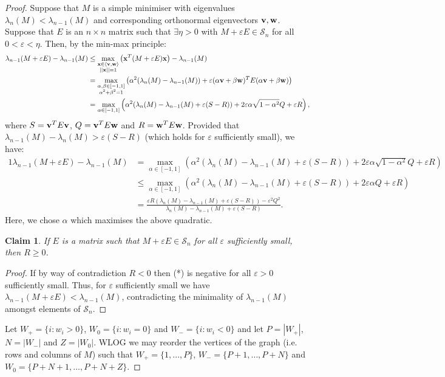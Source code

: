\documentclass[10pt,a4paper]{amsart}
\newtheorem{claim}{Claim}
\begin{document}
\begin{proof}
    Suppose that $M$ is a simple minimiser with eigenvalues $\lambda_n(M)<\lambda_{n-1}(M)$ and corresponding orthonormal eigenvectors $\bold{v,w}$. Suppose that $E$ is an $n\times n$ matrix such that $\exists \eta>0$ with $M+\varepsilon E \in \mathcal{S}_n$ for all $0<\varepsilon<\eta$. Then, by the min-max principle:
    \begin{alignat*}{1}
        \lambda_{n-1}(M+\varepsilon E) - \lambda_{n-1}(M) & \le \max_{\substack{\bold{x} \in \braket{\bold{v,w}} \\ ||\bold{x}|| = 1}} \left(\bold{x}^{T}(M+\varepsilon E)\bold{x} \right) - \lambda_{n-1}(M) \\
        & = \max_{\substack{\alpha, \beta \in [-1,1]\\ \alpha^2 + \beta^2 = 1}} \left(\alpha^2 (\lambda_{n}(M)-\lambda_{n-1}(M)) + \varepsilon(\alpha\bold{v} + \beta \bold{w})^{T}  E (\alpha\bold{v} + \beta \bold{w})\right)\\ & = \max_{\alpha\in [-1,1]} \left(\alpha^2 (\lambda_n(M)-\lambda_{n-1}(M) + \varepsilon(S-R)) + 2\varepsilon \alpha\sqrt{1-\alpha^2} Q + \varepsilon R\right),
    \end{alignat*}
    where $S = \bold{v}^{T}E\bold{v}$, $Q = \bold{v}^{T}E\bold{w}$ and $R = \bold{w}^{T}E\bold{w}$. Provided that $\lambda_{n-1}(M)-\lambda_{n}(M)>\varepsilon (S-R)$ (which holds for $\varepsilon$ sufficiently small), we have:
    \begin{alignat*}{1}
        \lambda_{n-1}(M+\varepsilon E) - \lambda_{n-1}(M) & = \max_{\alpha\in [-1,1]} \left(\alpha^2 (\lambda_n(M)-\lambda_{n-1}(M) + \varepsilon(S-R)) + 2\varepsilon \alpha\sqrt{1-\alpha^2} Q + \varepsilon R\right)\\ & \le  \max_{\alpha\in [-1,1]} \left(\alpha^2 (\lambda_n(M)-\lambda_{n-1}(M) + \varepsilon(S-R)) + 2\varepsilon \alpha Q + \varepsilon R\right) \\ & = \frac{\varepsilon R(\lambda_{n}(M)-\lambda_{n-1}(M) + \varepsilon(S-R)) - \varepsilon^2 Q^2}{\lambda_n(M)-\lambda_{n-1}(M) + \varepsilon(S-R)}. \tag{*}
    \end{alignat*}
    Here, we chose $\alpha$ which maximises the above quadratic.
    \begin{claim} If $E$ is a matrix such that $M+\varepsilon E \in \mathcal{S}_n$ for all $\varepsilon$ sufficiently small, then $R \ge 0$. 
    \end{claim}
    \begin{proof}
    If by way of contradiction $R < 0$ then (*) is negative for all $\varepsilon > 0$ sufficiently small. Thus, for $\varepsilon$ sufficiently small we have $\lambda_{n-1}(M+\varepsilon E)<\lambda_{n-1}(M)$, contradicting the minimality of $\lambda_{n-1}(M)$ amongst elements of ${\mathcal{S}}_n$. \end{proof}
    Let $W_{+} = \{i:w_i >0\}$, $W_{0} = \{i:w_i =0\}$ and $W_{-} = \{i:w_i<0\}$ and let $P = |W_{+}|$, $N = |W_{-}|$ and $Z = |W_{0}|$. WLOG we may reorder the vertices of the graph (i.e. rows and columns of $M$) such that $W_{+} = \{1,\dots, P\}$, $W_{-} = \{P+1,\dots, P+N\}$ and $W_{0} = \{P+N+1,\dots, P+N+Z\}$. 
    

\end{proof}
\end{document}
